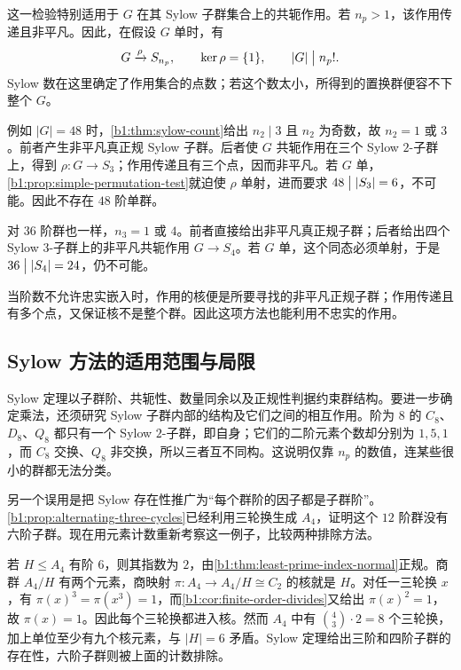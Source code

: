 这一检验特别适用于 \(G\) 在其 Sylow 子群集合上的共轭作用。若 \(n_p>1\)，该作用传递且非平凡。因此，在假设 \(G\) 单时，有
\[
	G\xrightarrow{\rho}S_{n_p}, \qquad \ker\rho=\{1\}, \qquad |G|\bigm\vert n_p!.
\]
Sylow 数在这里确定了作用集合的点数；若这个数太小，所得到的置换群便容不下整个 \(G\)。

\ProseParagraphBreak
例如 \(|G|=48\) 时，\cref{b1:thm:sylow-count}给出 \(n_2\mid3\) 且 \(n_2\) 为奇数，故 \(n_2=1\) 或 \(3\)。前者产生非平凡真正规 Sylow 子群。后者使 \(G\) 共轭作用在三个 Sylow \(2\)-子群上，得到 \(\rho:G\rightarrow S_3\)；作用传递且有三个点，因而非平凡。若 \(G\) 单，\cref{b1:prop:simple-permutation-test}就迫使 \(\rho\) 单射，进而要求 \(48\bigm\vert|S_3|=6\)，不可能。因此不存在 \(48\) 阶单群。

\ProseParagraphBreak
对 \(36\) 阶群也一样，\(n_3=1\) 或 \(4\)。前者直接给出非平凡真正规子群；后者给出四个 Sylow \(3\)-子群上的非平凡共轭作用 \(G\rightarrow S_4\)。若 \(G\) 单，这个同态必须单射，于是 \(36\bigm\vert|S_4|=24\)，仍不可能。

\ProseParagraphBreak
当阶数不允许忠实嵌入时，作用的核便是所要寻找的非平凡正规子群；作用传递且有多个点，又保证核不是整个群。因此这项方法也能利用不忠实的作用。

\subsection{Sylow 方法的适用范围与局限}
\label{b1:subsec:0504:03}

Sylow 定理以子群阶、共轭性、数量同余以及正规性判据约束群结构。要进一步确定乘法，还须研究 Sylow 子群内部的结构及它们之间的相互作用。阶为 \(8\) 的 \(C_8\)、\(D_8\)、\(Q_8\) 都只有一个 Sylow \(2\)-子群，即自身；它们的二阶元素个数却分别为 \(1,5,1\)，而 \(C_8\) 交换、\(Q_8\) 非交换，所以三者互不同构。这说明仅靠 \(n_p\) 的数值，连某些很小的群都无法分类。

\ProseParagraphBreak
另一个误用是把 Sylow 存在性推广为“每个群阶的因子都是子群阶”。\cref{b1:prop:alternating-three-cycles}已经利用三轮换生成 \(A_4\)，证明这个 \(12\) 阶群没有六阶子群。现在用元素计数重新考察这一例子，比较两种排除方法。

\ProseParagraphBreak
若 \(H\leq A_4\) 有阶 \(6\)，则其指数为 \(2\)，由\cref{b1:thm:least-prime-index-normal}正规。商群 \(A_4/H\) 有两个元素，商映射 \(\pi:A_4\rightarrow A_4/H\cong C_2\) 的核就是 \(H\)。对任一三轮换 \(x\)，有 \(\pi(x)^3=\pi(x^3)=1\)，而\cref{b1:cor:finite-order-divides}又给出 \(\pi(x)^2=1\)，故 \(\pi(x)=1\)。因此每个三轮换都进入核。然而 \(A_4\) 中有 \(\binom43\cdot2=8\) 个三轮换，加上单位至少有九个核元素，与 \(|H|=6\) 矛盾。Sylow 定理给出三阶和四阶子群的存在性，六阶子群则被上面的计数排除。


